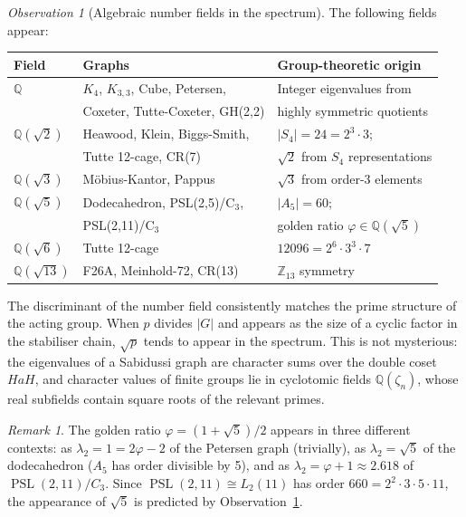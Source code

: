 \documentclass[11pt,a4paper]{article}
\theoremstyle{plain}
\theoremstyle{definition}
\theoremstyle{remark}
\newtheorem{remark}[theorem]{Remark}
\newtheorem{observation}[theorem]{Observation}
\newcommand{\Z}{\mathbb{Z}}
\newcommand{\PSL}{\operatorname{PSL}}
\begin{document}
\begin{observation}[Algebraic number fields in the spectrum]
\label{obs:fields}
The following fields appear:
\begin{center}
\small
\begin{tabular}{@{}l l l@{}}
\toprule
Field & Graphs & Group-theoretic origin \\
\midrule
$\mathbb{Q}$ & $K_4$, $K_{3,3}$, Cube, Petersen, & Integer eigenvalues from \\
              & Coxeter, Tutte-Coxeter, GH(2,2) & highly symmetric quotients \\
$\mathbb{Q}(\sqrt{2})$ & Heawood, Klein, Biggs-Smith, & $|S_4| = 24 = 2^3 \cdot 3$; \\
              & Tutte 12-cage, CR(7) & $\sqrt{2}$ from $S_4$ representations \\
$\mathbb{Q}(\sqrt{3})$ & M\"obius-Kantor, Pappus & $\sqrt{3}$ from order-3 elements \\
$\mathbb{Q}(\sqrt{5})$ & Dodecahedron, PSL(2,5)/C$_3$, & $|A_5| = 60$; \\
              & PSL(2,11)/C$_3$ & golden ratio $\varphi \in \mathbb{Q}(\sqrt{5})$ \\
$\mathbb{Q}(\sqrt{6})$ & Tutte 12-cage & $12096 = 2^6 \cdot 3^3 \cdot 7$ \\
$\mathbb{Q}(\sqrt{13})$ & F26A, Meinhold-72, CR(13) & $\Z_{13}$ symmetry \\
\bottomrule
\end{tabular}
\end{center}
\end{observation}

The discriminant of the number field consistently matches the prime
structure of the acting group. When $p$ divides $|G|$ and appears as
the size of a cyclic factor in the stabiliser chain, $\sqrt{p}$ tends
to appear in the spectrum. This is not mysterious: the eigenvalues of a
Sabidussi graph are character sums over the double coset $HaH$, and
character values of finite groups lie in cyclotomic fields
$\mathbb{Q}(\zeta_n)$, whose real subfields contain square roots of the
relevant primes.

\begin{remark}
The golden ratio $\varphi = (1 + \sqrt{5})/2$ appears in three different
contexts: as $\lambda_2 = 1 = 2\varphi - 2$ of the Petersen graph
(trivially), as $\lambda_2 = \sqrt{5}$ of the dodecahedron ($A_5$ has
order divisible by 5), and as $\lambda_2 = \varphi + 1 \approx 2.618$
of $\PSL(2,11)/C_3$. Since $\PSL(2,11) \cong L_2(11)$ has order
$660 = 2^2 \cdot 3 \cdot 5 \cdot 11$, the appearance of $\sqrt{5}$ is
predicted by Observation~\ref{obs:fields}.
\end{remark}
\end{document}
